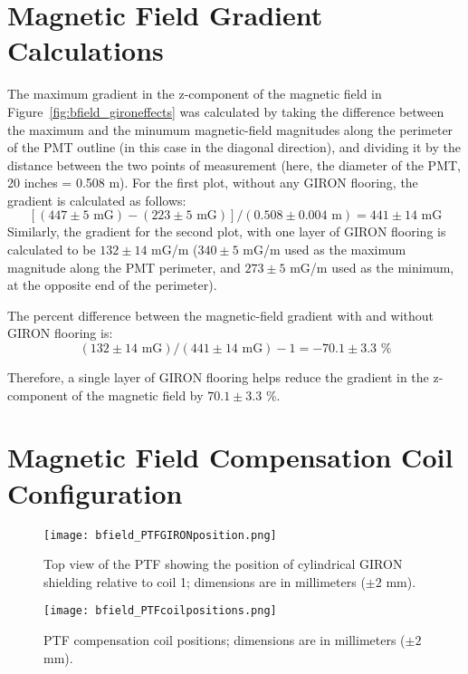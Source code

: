 \appendix

\section{Magnetic Field Gradient Calculations}
\label{Appendix:MagneticFieldGradientCalculations}

The maximum gradient in the z-component of the magnetic field in Figure~\ref{fig:bfield_gironeffects} was calculated by taking the difference between the maximum and the minumum magnetic-field magnitudes along the perimeter of the PMT outline (in this case in the diagonal direction), and dividing it by the distance between the two points of measurement (here, the diameter of the PMT, 20 inches = 0.508 m).
For the first plot, without any GIRON flooring, the gradient is calculated as follows:
\[[(447\pm5 \text{ mG}) - (223\pm5 \text{ mG})]/ (0.508\pm0.004 \text{ m} ) = 441\pm14 \text{ mG} \]
Similarly, the gradient for the second plot, with one layer of GIRON flooring is calculated to be $ 132\pm14 $ mG/m ($ 340\pm5 $ mG/m used as the maximum magnitude along the PMT perimeter, and $ 273\pm5 $ mG/m used as the minimum, at the opposite end of the perimeter).

The percent difference between the magnetic-field gradient with and without GIRON flooring is:
\[(132\pm14 \text{ mG})/(441\pm14 \text{ mG}) - 1 = -70.1\pm3.3 \text{ \%}\]

Therefore, a single layer of GIRON flooring helps reduce the gradient in the z-component of the magnetic field by $ 70.1\pm3.3 $ \%.

\section{Magnetic Field Compensation Coil Configuration}
\label{Appendix:CoilPositions}
%
\begin{figure}[h!]
   \begin{center}
   \texttt{[image: bfield\_PTFGIRONposition.png]}
   \caption{Top view of the PTF showing the position of cylindrical GIRON shielding relative to coil 1; dimensions are in millimeters ($\pm2$ mm).}
   \label{fig:gironpos}
   \end{center}
\end{figure}
%
%
\begin{figure}[hp]
   \begin{center}
   \texttt{[image: bfield\_PTFcoilpositions.png]}
   \caption{PTF compensation coil positions; dimensions are in millimeters ($\pm2$ mm).}
   \label{fig:coilpos}
   \end{center}
\end{figure}

